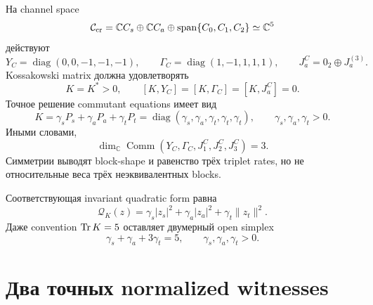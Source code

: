 На channel space
\begin{equation}
 \mathcal C_{\rm cr}=\mathbb C C_s\oplus\mathbb C C_a
 \oplus\operatorname{span}\{C_0,C_1,C_2\}\simeq\mathbb C^5
 \label{eq:v9-creation-origin-channel-space}
\end{equation}
действуют
\begin{equation}
 Y_C=\operatorname{diag}(0,0,-1,-1,-1),
 \qquad
 \Gamma_C=\operatorname{diag}(1,-1,1,1,1),
 \qquad
 J_a^C=0_2\oplus J_a^{(3)}.
 \label{eq:v9-creation-origin-channel-representation}
\end{equation}
Kossakowski matrix должна удовлетворять
\begin{equation}
 K=K^*>0,
 \qquad [K,Y_C]=[K,\Gamma_C]=[K,J_a^C]=0.
 \label{eq:v9-creation-origin-kossakowski-constraints}
\end{equation}
Точное решение commutant equations имеет вид
\begin{equation}
 K=\gamma_sP_s+\gamma_aP_a+\gamma_tP_t
 =\operatorname{diag}(\gamma_s,\gamma_a,
 \gamma_t,\gamma_t,\gamma_t),
 \qquad \gamma_s,\gamma_a,\gamma_t>0.
 \label{eq:v9-creation-origin-kossakowski-family}
\end{equation}
Иными словами,
\begin{equation}
 \dim_{\mathbb C}\operatorname{Comm}(Y_C,\Gamma_C,J_1^C,J_2^C,J_3^C)=3.
 \label{eq:v9-creation-origin-commutant-dimension}
\end{equation}
Симметрии выводят block-shape и равенство трёх triplet rates, но не
относительные веса трёх неэквивалентных blocks.

Соответствующая invariant quadratic form равна
\begin{equation}
 \mathcal Q_K(z)=\gamma_s|z_s|^2+\gamma_a|z_a|^2
 +\gamma_t\lVert z_t\rVert^2.
 \label{eq:v9-creation-origin-invariant-metric}
\end{equation}
Даже convention $\operatorname{Tr} K=5$ оставляет двумерный open simplex
\begin{equation}
 \gamma_s+\gamma_a+3\gamma_t=5,
 \qquad \gamma_s,\gamma_a,\gamma_t>0.
 \label{eq:v9-creation-origin-normalized-simplex}
\end{equation}

\section{Два точных normalized witnesses}

